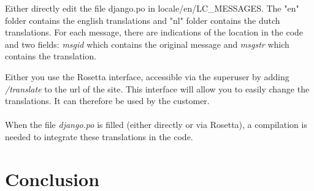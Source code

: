 \documentclass[11pt, a4paper]{article}   	%
\begin{document}
Either directly edit the file django.po in locale/en/LC\_MESSAGES. The "en" folder contains the english translations and "nl" folder contains the dutch translations. For each message, there are indications of the location in the code and two fields: \textit{msgid} which contains the original message and \textit{msgstr} which contains the translation.

Either you use the Rosetta interface, accessible via the superuser by adding \textit{/translate} to the url of the site. This interface will allow you to easily change the translations. It can therefore be used by the customer.\\
\\
When the file \textit{django.po} is filled (either directly or via Rosetta), a compilation is needed to integrate these translations in the code.


\section{Conclusion}
\end{document}
